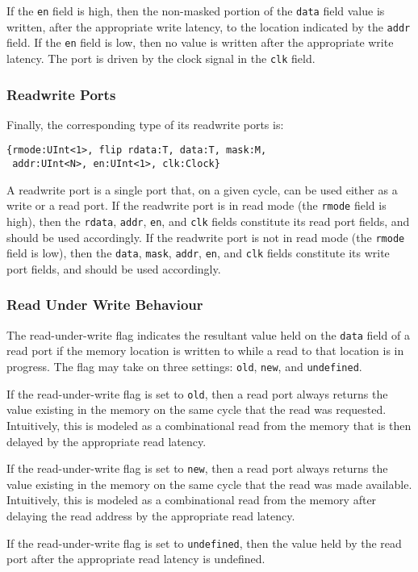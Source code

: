 \documentclass[12pt]{article}
\begin{document}
If the \verb|en| field is high, then the non-masked portion of the \verb|data| field value is written, after the appropriate write latency, to the location indicated by the \verb|addr| field. If the \verb|en| field is low, then no value is written after the appropriate write latency. The port is driven by the clock signal in the \verb|clk| field.

\subsubsection{Readwrite Ports}
Finally, the corresponding type of its readwrite ports is:
\begin{verbatim}
{rmode:UInt<1>, flip rdata:T, data:T, mask:M, 
 addr:UInt<N>, en:UInt<1>, clk:Clock}
\end{verbatim}
A readwrite port is a single port that, on a given cycle, can be used either as a write or a read port. If the readwrite port is in read mode (the \verb|rmode| field is high), then the \verb|rdata|, \verb|addr|, \verb|en|, and \verb|clk| fields constitute its read port fields, and should be used accordingly. If the readwrite port is not in read mode (the \verb|rmode| field is low), then the \verb|data|, \verb|mask|, \verb|addr|, \verb|en|, and \verb|clk| fields constitute its write port fields, and should be used accordingly. 

\subsubsection{Read Under Write Behaviour}
The read-under-write flag indicates the resultant value held on the \verb|data| field of a read port if the memory location is written to while a read to that location is in progress. The flag may take on three settings: \verb|old|, \verb|new|, and \verb|undefined|.

If the read-under-write flag is set to \verb|old|, then a read port always returns the value existing in the memory on the same cycle that the read was requested. Intuitively, this is modeled as a combinational read from the memory that is then delayed by the appropriate read latency.

If the read-under-write flag is set to \verb|new|, then a read port always returns the value existing in the memory on the same cycle that the read was made available. Intuitively, this is modeled as a combinational read from the memory after delaying the read address by the appropriate read latency.

If the read-under-write flag is set to \verb|undefined|, then the value held by the read port after the appropriate read latency is undefined.
\end{document}

